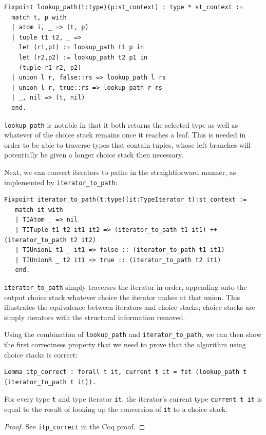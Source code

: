 \documentclass[a4paper,english]{lipics-v2018}
\begin{document}
\begin{small}\begin{verbatim}
Fixpoint lookup_path(t:type)(p:st_context) : type * st_context :=
  match t, p with
  | atom i, _ => (t, p)
  | tuple t1 t2, _ =>
    let (r1,p1) := lookup_path t1 p in
    let (r2,p2) := lookup_path t2 p1 in
    (tuple r1 r2, p2)
  | union l r, false::rs => lookup_path l rs
  | union l r, true::rs => lookup_path r rs
  | _, nil => (t, nil)
  end.
\end{verbatim}\end{small}

\verb|lookup_path| is notable in that it both returns the selected type as
well as whatever of the choice stack remains once it reaches a leaf. This is
needed in order to be able to traverse types that contain tuples,  whose left
branches will potentially be given a longer choice stack then necessary.

Next, we can convert iterators to paths in the straightforward manner, as
implemented by \verb|iterator_to_path|:

\begin{small}\begin{verbatim}
Fixpoint iterator_to_path(t:type)(it:TypeIterator t):st_context :=
   match it with
   | TIAtom _ => nil
   | TITuple t1 t2 it1 it2 => (iterator_to_path t1 it1) ++ (iterator_to_path t2 it2)
   | TIUnionL t1 _ it1 => false :: (iterator_to_path t1 it1)
   | TIUnionR _ t2 it1 => true :: (iterator_to_path t2 it1)
   end.
\end{verbatim}\end{small}

\verb|iterator_to_path| simply traverses the iterator in order, appending onto the
output choice stack whatever choice the iterator makes at that union. This illustrates
the equivalence between iterators and choice stacks; choice stacks are simply iterators
with the structural information removed.

Using the combination of \verb|lookup_path| and \verb|iterator_to_path|, we
can then show the first correctness property that we need to prove that the
algorithm using choice stacks is correct:

\begin{lemma}
\begin{small}\begin{verbatim}
Lemma itp_correct : forall t it, current t it = fst (lookup_path t (iterator_to_path t it)).
\end{verbatim}\end{small}

For every type \verb|t| and type iterator \verb|it|, the iterator's current type \verb|current t it| is equal
to the result of looking up the conversion of \verb|it| to a choice stack.
\end{lemma}
\begin{proof}
See \verb|itp_correct| in the Coq proof.
\end{proof}
\end{document}
